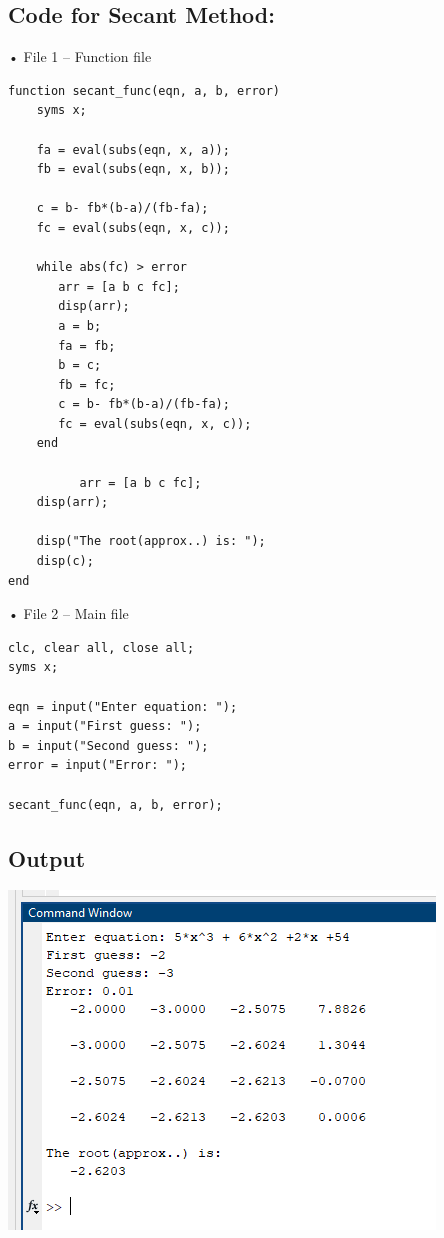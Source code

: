 \documentclass[12pt]{article}
\begin{document}
\subsection*{Code for Secant Method:}
•	File 1 – Function file
\begin{verbatim}
function secant_func(eqn, a, b, error)
    syms x;
    
    fa = eval(subs(eqn, x, a));
    fb = eval(subs(eqn, x, b));
 
    c = b- fb*(b-a)/(fb-fa);
    fc = eval(subs(eqn, x, c));
 
    while abs(fc) > error
       arr = [a b c fc];
       disp(arr);
       a = b;
       fa = fb;
       b = c; 
       fb = fc;
       c = b- fb*(b-a)/(fb-fa);
       fc = eval(subs(eqn, x, c));
    end

          arr = [a b c fc];
    disp(arr);

    disp("The root(approx..) is: ");
    disp(c);
end
\end{verbatim}
•	File 2 – Main file
\begin{verbatim}
clc, clear all, close all;
syms x;
 
eqn = input("Enter equation: ");
a = input("First guess: ");
b = input("Second guess: ");
error = input("Error: ");
 
secant_func(eqn, a, b, error);
\end{verbatim}
\subsection*{Output}
\begin{center}
    \centering
    \includegraphics[width = .9\textwidth]{image.png}
\end{center}
\end{document}
